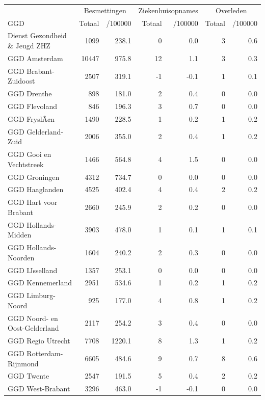 \documentclass[
  english,
  man,floatsintext]{apa6}
\begin{document}
\begin{table}
\centering\begingroup\fontsize{10}{12}\selectfont

\begin{threeparttable}
\begin{tabular}{lrrrrrr}
\toprule
\multicolumn{1}{c}{ } & \multicolumn{2}{c}{Besmettingen} & \multicolumn{2}{c}{Ziekenhuisopnames} & \multicolumn{2}{c}{Overleden} \\
\cmidrule(l{3pt}r{3pt}){2-3} \cmidrule(l{3pt}r{3pt}){4-5} \cmidrule(l{3pt}r{3pt}){6-7}
GGD & Totaal & /100000 & Totaal & /100000 & Totaal & /100000\\
\midrule
Dienst Gezondheid \& Jeugd ZHZ & 1099 & 238.1 & 0 & 0.0 & 3 & 0.6\\
GGD Amsterdam & 10447 & 975.8 & 12 & 1.1 & 3 & 0.3\\
GGD Brabant-Zuidoost & 2507 & 319.1 & -1 & -0.1 & 1 & 0.1\\
GGD Drenthe & 898 & 181.0 & 2 & 0.4 & 0 & 0.0\\
GGD Flevoland & 846 & 196.3 & 3 & 0.7 & 0 & 0.0\\
GGD FryslÃ¢n & 1490 & 228.5 & 1 & 0.2 & 1 & 0.2\\
GGD Gelderland-Zuid & 2006 & 355.0 & 2 & 0.4 & 1 & 0.2\\
GGD Gooi en Vechtstreek & 1466 & 564.8 & 4 & 1.5 & 0 & 0.0\\
GGD Groningen & 4312 & 734.7 & 0 & 0.0 & 0 & 0.0\\
GGD Haaglanden & 4525 & 402.4 & 4 & 0.4 & 2 & 0.2\\
GGD Hart voor Brabant & 2660 & 245.9 & 2 & 0.2 & 0 & 0.0\\
GGD Hollands-Midden & 3903 & 478.0 & 1 & 0.1 & 1 & 0.1\\
GGD Hollands-Noorden & 1604 & 240.2 & 2 & 0.3 & 0 & 0.0\\
GGD IJsselland & 1357 & 253.1 & 0 & 0.0 & 0 & 0.0\\
GGD Kennemerland & 2951 & 534.6 & 1 & 0.2 & 1 & 0.2\\
GGD Limburg-Noord & 925 & 177.0 & 4 & 0.8 & 1 & 0.2\\
GGD Noord- en Oost-Gelderland & 2117 & 254.2 & 3 & 0.4 & 0 & 0.0\\
GGD Regio Utrecht & 7708 & 1220.1 & 8 & 1.3 & 1 & 0.2\\
GGD Rotterdam-Rijnmond & 6605 & 484.6 & 9 & 0.7 & 8 & 0.6\\
GGD Twente & 2547 & 191.5 & 5 & 0.4 & 2 & 0.2\\
GGD West-Brabant & 3296 & 463.0 & -1 & -0.1 & 0 & 0.0\\

\end{tabular}
\end{threeparttable}
\end{table}
\end{document}
